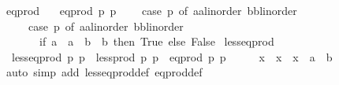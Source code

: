 \begin{isabellebody}
\ eq{\isacharunderscore}{\kern0pt}prod\ \isanewline
\ \ {\isachardoublequoteopen}eq{\isacharunderscore}{\kern0pt}prod\ p{}\ p{}\ {\isasymequiv}\isanewline
\ \ \ case\ p{}\ of\ {\isacharparenleft}{\kern0pt}a{}{\isacharcolon}{\kern0pt}{\isacharcolon}{\kern0pt}{\isacharprime}{\kern0pt}a{\isacharcolon}{\kern0pt}{\isacharcolon}{\kern0pt}linorder{\isacharcomma}{\kern0pt}\ b{}{\isacharcolon}{\kern0pt}{\isacharcolon}{\kern0pt}{\isacharprime}{\kern0pt}b{\isacharcolon}{\kern0pt}{\isacharcolon}{\kern0pt}linorder{\isacharparenright}{\kern0pt}\ {\isasymRightarrow}\isanewline
\ \ \ \ \ case\ p{}\ of\ {\isacharparenleft}{\kern0pt}a{}{\isacharcolon}{\kern0pt}{\isacharcolon}{\kern0pt}{\isacharprime}{\kern0pt}a{\isacharcolon}{\kern0pt}{\isacharcolon}{\kern0pt}linorder{\isacharcomma}{\kern0pt}\ b{}{\isacharcolon}{\kern0pt}{\isacharcolon}{\kern0pt}{\isacharprime}{\kern0pt}b{\isacharcolon}{\kern0pt}{\isacharcolon}{\kern0pt}linorder{\isacharparenright}{\kern0pt}\ {\isasymRightarrow}\isanewline
\ \ \ \ \ \ \ if\ {\isacharparenleft}{\kern0pt}a{}\ {\isacharequal}{\kern0pt}\ a{}{\isacharparenright}{\kern0pt}\ {\isasymand}\ {\isacharparenleft}{\kern0pt}b{}\ {\isacharequal}{\kern0pt}\ b{}{\isacharparenright}{\kern0pt}\ then\ True\ else\ False{\isachardoublequoteclose}\isanewline
\isanewline
{}\isamarkupfalse%
\ less{\isacharunderscore}{\kern0pt}eq{\isacharunderscore}{\kern0pt}prod\ \isanewline
\ \ {\isachardoublequoteopen}less{\isacharunderscore}{\kern0pt}eq{\isacharunderscore}{\kern0pt}prod\ p{}\ p{}\ {\isasymequiv}\ less{\isacharunderscore}{\kern0pt}prod{\isacharprime}{\kern0pt}\ p{}\ p{}\ {\isasymor}\ eq{\isacharunderscore}{\kern0pt}prod\ p{}\ p{}{\isachardoublequoteclose}\isanewline
\isanewline
{}\isamarkupfalse%
%
\endisataginvisible
{\isafoldinvisible}%
%
\isadeliminvisible
%
\endisadeliminvisible
%
\isadelimproof
\ %
\endisadelimproof
%
\isatagproof
{}\isamarkupfalse%
\isanewline
\ \ \isamarkupfalse%
\ {\isachardoublequoteopen}x\ {\isasymle}\ x{\isachardoublequoteclose}\ \ x\ {\isacharcolon}{\kern0pt}{\isacharcolon}{\kern0pt}\ {\isachardoublequoteopen}{\isacharprime}{\kern0pt}a\ {\isasymtimes}\ {\isacharprime}{\kern0pt}b{\isachardoublequoteclose}\isanewline
\ \ \ \ \isamarkupfalse%
\ {\isacharparenleft}{\kern0pt}auto\ simp\ add{\isacharcolon}{\kern0pt}\ less{\isacharunderscore}{\kern0pt}eq{\isacharunderscore}{\kern0pt}prod{\isacharunderscore}{\kern0pt}def\ eq{\isacharunderscore}{\kern0pt}prod{\isacharunderscore}{\kern0pt}def{\isacharparenright}{\kern0pt}\isanewline

\end{isabellebody}
